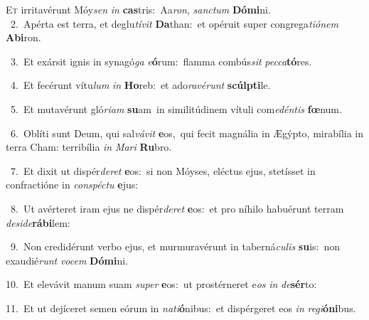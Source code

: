 \lettrine{\initial\textcolor{\initialcolor}{E}}{t} irritavérunt Móy\textit{sen} \textit{in} \textbf{cas}\-tris:~\star Aa\-\textit{ron}\-, \textit{sanc}\-\textit{tum} \textbf{Dó}\-\textbf{mi}ni.\\
{\numbfont\textcolor{\numbcolor}{~2.}}~Apérta est terra, et deglu\-\textit{tí}\-\textit{vit} \textbf{Da}\-than:~\star et opéruit super congrega\-\textit{ti}\-\textit{ó}\textit{nem} \textbf{Ab}\-\textbf{i}ron.\par
{\numbfont\textcolor{\numbcolor}{~3.}}~Et exársit ignis in synagó\textit{ga} \textit{e}\-\textbf{ó}rum:~\star flamma combús\textit{sit} \textit{pec}\-\textit{ca}\textbf{tó}res.\par
{\numbfont\textcolor{\numbcolor}{~4.}}~Et fecérunt vítu\textit{lum} \textit{in} \textbf{Ho}\-reb:~\star et ado\-\textit{ra}\-\textit{vé}\textit{runt} \textbf{scúlp}\-\textbf{ti}le.\par
{\numbfont\textcolor{\numbcolor}{~5.}}~Et mutavérunt gló\-\textit{ri}\-\textit{am} \textbf{su}\-am~\star in similitúdinem vítuli com\-\textit{e}\-\textit{dén}\textit{tis} \textbf{fœ}\-num.\par
{\numbfont\textcolor{\numbcolor}{~6.}}~Oblíti sunt Deum, qui sal\-\textit{vá}\-\textit{vit} \textbf{e}\-os,~\star qui fecit magnália in Ægýpto, mirabília in terra Cham: terribília \textit{in} \textit{Ma}\-\textit{ri} \textbf{Ru}\-bro.\par
{\numbfont\textcolor{\numbcolor}{~7.}}~Et dixit ut dispér\-\textit{de}\-\textit{ret} \textbf{e}\-os:~\star si non Móyses, eléctus ejus, stetísset in confractióne in \textit{con}\-\textit{spéc}\textit{tu} \textbf{e}\-jus:\par
{\numbfont\textcolor{\numbcolor}{~8.}}~Ut avérteret iram ejus ne dispér\-\textit{de}\-\textit{ret} \textbf{e}\-os:~\star et pro níhilo habuérunt terram \textit{de}\-\textit{si}\textit{de}\textbf{rá}\textbf{bi}lem:\par
{\numbfont\textcolor{\numbcolor}{~9.}}~Non credidérunt verbo ejus, et murmuravérunt in taberná\-\textit{cu}\-\textit{lis} \textbf{su}\-is:~\star non exaudié\textit{runt} \textit{vo}\-\textit{cem} \textbf{Dó}\-\textbf{mi}ni.\par
{\numbfont\textcolor{\numbcolor}{10.}}~Et elevávit manum suam \textit{su}\-\textit{per} \textbf{e}\-os:~\star ut prostérneret e\textit{os} \textit{in} \textit{de}\-\textbf{sér}to:\par
{\numbfont\textcolor{\numbcolor}{11.}}~Et ut dejíceret semen eórum in \textit{na}\-\textit{ti}\textbf{ó}nibus:~\star et dispérgeret eos \textit{in} \textit{re}\-\textit{gi}\textbf{ó}\textbf{ni}bus.\par
